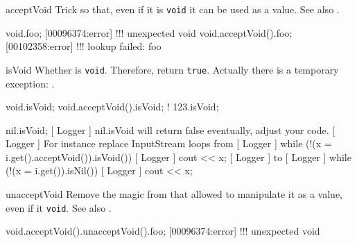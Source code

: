 \begin{urbiscriptapi}
\item[acceptVoid]%
  Trick \this so that, even if it is \lstinline|void| it can be used as a
  value.  See also .
\begin{urbiscript}
void.foo;
[00096374:error] !!! unexpected void
void.acceptVoid().foo;
[00102358:error] !!! lookup failed: foo
\end{urbiscript}


\item[isVoid]%
  Whether \this is \lstinline|void|.  Therefore, return \lstinline|true|.
  Actually there is a temporary exception: .
\begin{urbiassert}
void.isVoid;
void.acceptVoid().isVoid;
! 123.isVoid;

nil.isVoid;
[     Logger     ] nil.isVoid will return false eventually, adjust your code.
[     Logger     ]     For instance replace InputStream loops from
[     Logger     ]       while (!(x = i.get().acceptVoid()).isVoid())
[     Logger     ]         cout << x;
[     Logger     ]     to
[     Logger     ]       while (!(x = i.get()).isNil())
[     Logger     ]         cout << x;
\end{urbiassert}


\item[unacceptVoid]%
  Remove the magic from \this that allowed to manipulate it as a value, even
  if it \lstinline|void|.  See also .
\begin{urbiscript}
void.acceptVoid().unacceptVoid().foo;
[00096374:error] !!! unexpected void
\end{urbiscript}
\end{urbiscriptapi}




